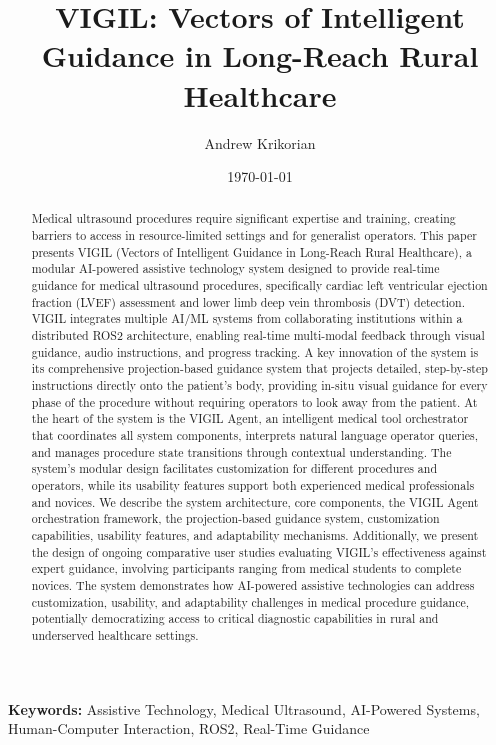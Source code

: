 \documentclass[12pt,a4paper]{article}
\title{VIGIL: Vectors of Intelligent Guidance in Long-Reach Rural Healthcare}
\author{Andrew Krikorian}
\date{\today}
\begin{document}
\maketitle

\begin{abstract}
Medical ultrasound procedures require significant expertise and training, creating barriers to access in resource-limited settings and for generalist operators. This paper presents VIGIL (Vectors of Intelligent Guidance in Long-Reach Rural Healthcare), a modular AI-powered assistive technology system designed to provide real-time guidance for medical ultrasound procedures, specifically cardiac left ventricular ejection fraction (LVEF) assessment and lower limb deep vein thrombosis (DVT) detection. VIGIL integrates multiple AI/ML systems from collaborating institutions within a distributed ROS2 architecture, enabling real-time multi-modal feedback through visual guidance, audio instructions, and progress tracking. A key innovation of the system is its comprehensive projection-based guidance system that projects detailed, step-by-step instructions directly onto the patient's body, providing in-situ visual guidance for every phase of the procedure without requiring operators to look away from the patient. At the heart of the system is the VIGIL Agent, an intelligent medical tool orchestrator that coordinates all system components, interprets natural language operator queries, and manages procedure state transitions through contextual understanding. The system's modular design facilitates customization for different procedures and operators, while its usability features support both experienced medical professionals and novices. We describe the system architecture, core components, the VIGIL Agent orchestration framework, the projection-based guidance system, customization capabilities, usability features, and adaptability mechanisms. Additionally, we present the design of ongoing comparative user studies evaluating VIGIL's effectiveness against expert guidance, involving participants ranging from medical students to complete novices. The system demonstrates how AI-powered assistive technologies can address customization, usability, and adaptability challenges in medical procedure guidance, potentially democratizing access to critical diagnostic capabilities in rural and underserved healthcare settings.
\end{abstract}

\textbf{Keywords:} Assistive Technology, Medical Ultrasound, AI-Powered Systems, Human-Computer Interaction, ROS2, Real-Time Guidance
\end{document}
